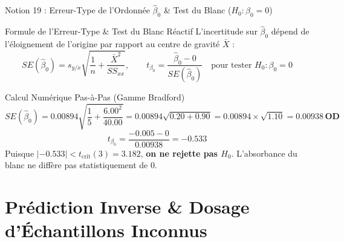 \documentclass[aspectratio=169,10pt]{beamer}
\begin{document}
\begin{frame}{Notion 19 : Erreur-Type de l'Ordonnée $\hat{\beta}_0$ \& Test du Blanc ($H_0: \beta_0 = 0$)}
  \begin{conceptbox}{Formule de l'Erreur-Type \& Test du Blanc Réactif}
    \footnotesize
    L'incertitude sur $\hat{\beta}_0$ dépend de l'éloignement de l'origine par rapport au centre de gravité $\bar{X}$ :
    \begin{equation*}
      SE(\hat{\beta}_0) = s_{y/x} \sqrt{\frac{1}{n} + \frac{\bar{X}^2}{SS_{xx}}}, \qquad t_{\beta_0} = \frac{\hat{\beta}_0 - 0}{SE(\hat{\beta}_0)} \quad \text{pour tester } H_0 : \beta_0 = 0
    \end{equation*}
  \end{conceptbox}
  \vspace{1mm}
  \begin{biobox}{Calcul Numérique Pas-à-Pas (Gamme Bradford)}
    \footnotesize
    \begin{equation*}
      SE(\hat{\beta}_0) = 0.00894 \sqrt{\frac{1}{5} + \frac{6.00^2}{40.00}} = 0.00894 \sqrt{0.20 + 0.90} = 0.00894 \times \sqrt{1.10} = \mathbf{0.00938\,\text{OD}}
    \end{equation*}
    \begin{equation*}
      t_{\beta_0} = \frac{-0.005 - 0}{0.00938} = \mathbf{-0.533}
    \end{equation*}
    Puisque $|-0.533| < t_{\text{crit}}(3) = 3.182$, \textbf{on ne rejette pas $H_0$}. L'absorbance du blanc ne diffère pas statistiquement de 0.
  \end{biobox}
\end{frame}

\section{Prédiction Inverse \& Dosage d'Échantillons Inconnus}
\end{document}
